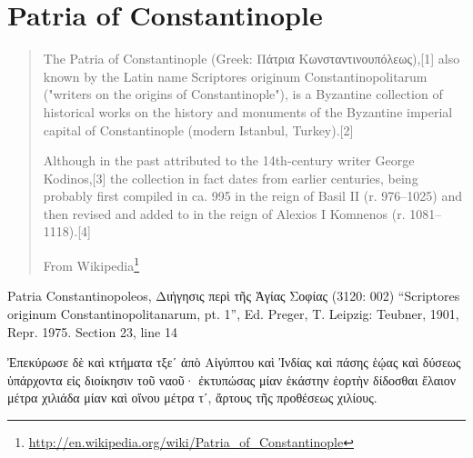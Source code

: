 \documentclass[12pt,letterpaper,twoside,final]{memoir}
\begin{document}
\section{Patria of Constantinople}
\blockquote[From Wikipedia\footnote{\url{http://en.wikipedia.org/wiki/Patria_of_Constantinople}}]{The Patria of Constantinople (Greek: Πάτρια Κωνσταντινουπόλεως),[1] also known by the Latin name Scriptores originum Constantinopolitarum ("writers on the origins of Constantinople"), is a Byzantine collection of historical works on the history and monuments of the Byzantine imperial capital of Constantinople (modern Istanbul, Turkey).[2]

Although in the past attributed to the 14th-century writer George Kodinos,[3] the collection in fact dates from earlier centuries, being probably first compiled in ca. 995 in the reign of Basil II (r. 976–1025) and then revised and added to in the reign of Alexios I Komnenos (r. 1081–1118).[4]}
\begin{greek}

Patria Constantinopoleos, Διήγησις περὶ τῆς Ἁγίας Σοφίας (3120: 002)
“Scriptores originum Constantinopolitanarum, pt. 1”, Ed. Preger, T.
Leipzig: Teubner, 1901, Repr. 1975.
Section 23, line 14

                                      Ἐπεκύρωσε δὲ καὶ κτήματα 
τξεʹ ἀπὸ Αἰγύπτου καὶ Ἰνδίας καὶ πάσης ἑῴας καὶ δύσεως 
ὑπάρχοντα εἰς διοίκησιν τοῦ ναοῦ· ἐκτυπώσας μίαν ἑκάστην 
ἑορτὴν δίδοσθαι ἔλαιον μέτρα χιλιάδα μίαν καὶ οἴνου μέτρα 
τʹ, ἄρτους τῆς προθέσεως χιλίους. 

\end{greek}
\end{document}
